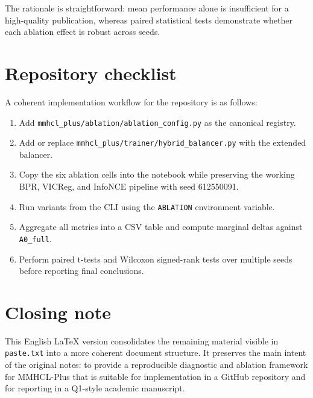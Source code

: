 \documentclass[11pt,a4paper]{article}
\begin{document}
The rationale is straightforward: mean performance alone is insufficient for a high-quality publication, whereas paired statistical tests demonstrate whether each ablation effect is robust across seeds.

\section{Repository checklist}
A coherent implementation workflow for the repository is as follows:
\begin{enumerate}[leftmargin=1.6em]
\item Add \texttt{mmhcl\_plus/ablation/ablation\_config.py} as the canonical registry.
\item Add or replace \texttt{mmhcl\_plus/trainer/hybrid\_balancer.py} with the extended balancer.
\item Copy the six ablation cells into the notebook while preserving the working BPR, VICReg, and InfoNCE pipeline with seed 612550091.
\item Run variants from the CLI using the \texttt{ABLATION} environment variable.
\item Aggregate all metrics into a CSV table and compute marginal deltas against \texttt{A0\_full}.
\item Perform paired t-tests and Wilcoxon signed-rank tests over multiple seeds before reporting final conclusions.
\end{enumerate}

\section{Closing note}
This English LaTeX version consolidates the remaining material visible in \texttt{paste.txt} into a more coherent document structure. It preserves the main intent of the original notes: to provide a reproducible diagnostic and ablation framework for MMHCL-Plus that is suitable for implementation in a GitHub repository and for reporting in a Q1-style academic manuscript.
\end{document}
